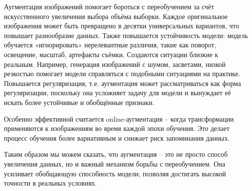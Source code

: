 Аугментация изображений помогает бороться с переобучением за счёт искусственного увеличения выбора объёма выборки. Каждое оригинальное изображения может быть превращено в десятки универсальных вариантов, что повышает разнообразие данных. Также повышается устойчивость модели: модель обучается «игнорировать» нерелевантные различия, такие как поворот, освещение, масштаб, артефакты съёмки. Создаются ситуации близкие к реальным. Например, генерация изображений с шумом, засветами, низкой резкостью помогает модели справляться с подобными ситуациями на практике. Повышается регуляризация, т.е. аугментация может рассматриваться как форма регуляризации, поскольку она усложняет задачу для модели и вынуждает её искать более устойчивые и обобщённые признаки.

Особенно эффективной считается online-аугментация – когда трансформации применяются к изображениям во время каждой эпохи обучения. Это делает процесс обучения более вариативным и снижает риск запоминания данных.

Таким образом мы можем сказать, что аугментация – это не просто способ увеличения данных, но и важный механизм борьбы с переобучением. Она усиливает обобщающую способность модели, позволяя достигать высокой точности в реальных условиях.
